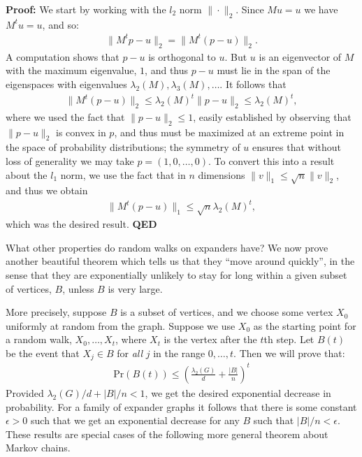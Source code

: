 \documentclass[12pt]{article}
\begin{document}
\textbf{Proof:} We start by working with the $l_2$ norm $\| \cdot
\|_2$.  Since $Mu = u$ we have $M^t u = u$, and so:
\begin{eqnarray}
  \|M^t p - u \|_2 = \|M^t(p-u) \|_2.
\end{eqnarray}
A computation shows that $p-u$ is orthogonal to $u$.  But $u$ is an
eigenvector of $M$ with the maximum eigenvalue, $1$, and thus $p-u$
must lie in the span of the eigenspaces with eigenvalues
$\lambda_2(M),\lambda_3(M),\ldots$.  It follows that
\begin{eqnarray}
  \|M^t(p-u)\|_2 \leq \lambda_2(M)^t \|p-u\|_2 \leq \lambda_2(M)^t,
\end{eqnarray}
where we used the fact that $\| p-u\|_2 \leq 1$, easily established by
observing that $\|p-u\|_2$ is convex in $p$, and thus must be
maximized at an extreme point in the space of probability
distributions; the symmetry of $u$ ensures that without loss of
generality we may take $p = (1,0,\ldots,0)$.  To convert this into a
result about the $l_1$ norm, we use the fact that in $n$ dimensions
$\|v\|_1 \leq \sqrt{n} \|v\|_2$, and thus we obtain
\begin{eqnarray}
  \|M^t(p-u)\|_1 \leq \sqrt{n} \lambda_2(M)^t,
\end{eqnarray}
which was the desired result.  \textbf{QED}

What other properties do random walks on expanders have?  We now prove
another beautiful theorem which tells us that they ``move around
quickly'', in the sense that they are exponentially unlikely to stay
for long within a given subset of vertices, $B$, unless $B$ is very
large.

More precisely, suppose $B$ is a subset of vertices, and we choose
some vertex $X_0$ uniformly at random from the graph.  Suppose we use
$X_0$ as the starting point for a random walk, $X_0,\ldots,X_t$, where
$X_t$ is the vertex after the $t$th step.  Let $B(t)$ be the event
that $X_j \in B$ for \emph{all} $j$ in the range $0,\ldots,t$.  Then
we will prove that:
\begin{eqnarray}
  \mbox{Pr}(B(t)) \leq \left( \frac{\lambda_2(G)}{d} + \frac{|B|}{n}
    \right)^t 
\end{eqnarray}
Provided $\lambda_2(G)/d + |B|/n < 1$, we get the desired exponential
decrease in probability.  For a family of expander graphs it follows
that there is some constant $\epsilon > 0$ such that we get an
exponential decrease for any $B$ such that $|B|/n < \epsilon$.  These
results are special cases of the following more general theorem about
Markov chains.
\end{document}
